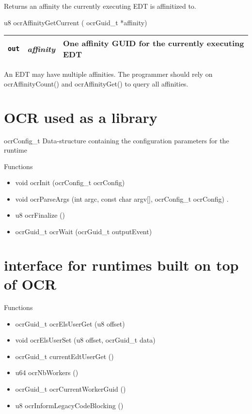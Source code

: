 Returns an affinity the currently executing E\-D\-T is affinitized to.

\begin{boxedcode}
 u8 ocrAffinityGetCurrent ( ocrGuid\_t *affinity)
\end{boxedcode}


\begin{table}[h]
\begin{tabular}{l l l}
\hline
\mbox{\tt out}  & {\em affinity} & One affinity G\-U\-I\-D for the currently executing E\-D\-T \\
\hline
\end{tabular}
\end{table}

\descr
An E\-D\-T may have multiple affinities. The programmer should rely on
ocr\-Affinity\-Count() and ocr\-Affinity\-Get() to query all affinities.

\section{OCR used as a library}


ocrConfig\_t
Data-structure containing the configuration parameters for the runtime

Functions
\begin{itemize}
\item void ocrInit (ocrConfig\_t ocrConfig)

\item void ocrParseArgs (int argc, const char argv[], ocrConfig\_t ocrConfig)
 .
\item u8 ocrFinalize ()

\item ocrGuid\_t ocrWait (ocrGuid\_t outputEvent)
\end{itemize}



\section{interface for runtimes built on top of OCR}

Functions
\begin{itemize}
\item  ocrGuid\_t ocrElsUserGet (u8 offset)

\item void ocrElsUserSet (u8 offset, ocrGuid\_t data)

\item ocrGuid\_t currentEdtUserGet ()

\item  u64 ocrNbWorkers ()

\item  ocrGuid\_t ocrCurrentWorkerGuid ()

\item  u8 ocrInformLegacyCodeBlocking ()

\end{itemize}


